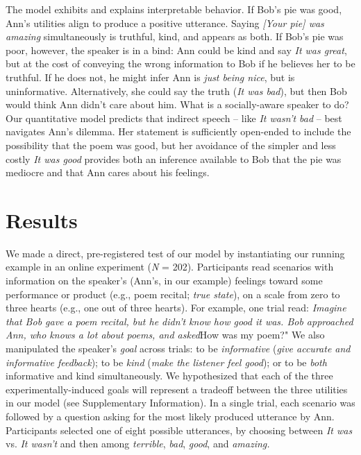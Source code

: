 \documentclass[9pt,twocolumn,twoside,lineno]{main_class_file}
\begin{document}
The model exhibits and explains interpretable behavior.
If Bob's pie was good, Ann's utilities align to produce a positive utterance. 
Saying \emph{{[}Your pie{]} was amazing} simultaneously is truthful, kind, and appears as both. 
If Bob's pie was poor, however, the speaker is in a bind: Ann could be kind and say \emph{It was great}, but at the cost of conveying the wrong information to Bob if he believes her to be truthful. 
If he does not, he might infer Ann is \emph{just being
nice}, but is uninformative. Alternatively, she could say the truth
(\emph{It was bad}), but then Bob would think Ann didn't care about
him. 
What is a socially-aware speaker to do? Our quantitative model predicts that
indirect speech -- like \emph{It wasn't bad} -- best navigates Ann's
dilemma. Her statement is sufficiently open-ended to include the
possibility that the poem was good, but her avoidance of the simpler and
less costly \emph{It was good} provides both an inference available to Bob that the
pie was mediocre and that Ann cares about his feelings.

\section*{Results}

We made a direct, pre-registered test of our model by instantiating our running
example in an online experiment (\emph{N} = 202). Participants
read scenarios with information on the speaker's (Ann's,
in our example) feelings toward some performance or product (e.g., poem
recital; \emph{true state}), on a scale from zero to three hearts (e.g.,
one out of three hearts). For example, one trial read: \emph{Imagine
that Bob gave a poem recital, but he didn't know how good it was. Bob
approached Ann, who knows a lot about poems, and asked}How was my poem?"
We also manipulated the speaker's \emph{goal} across trials: to be
\emph{informative} (\emph{give accurate and informative feedback});
to be \emph{kind} (\emph{make the listener feel good}); or to be
\emph{both} informative and kind simultaneously. We hypothesized that
each of the three experimentally-induced goals will represent a tradeoff between the three
utilities in our model (see Supplementary Information). In a single
trial, each scenario was followed by a question asking for the most
likely produced utterance by Ann. Participants selected one of eight possible
utterances, by choosing between \emph{It was} vs. \emph{It wasn't} and
then among \emph{terrible}, \emph{bad}, \emph{good}, and \emph{amazing.}
\end{document}
